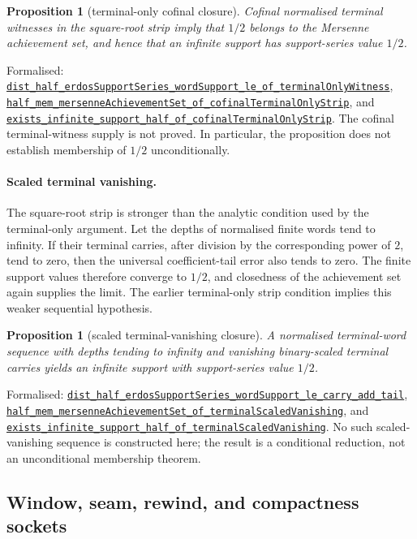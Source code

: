 \documentclass[11pt]{article}
\newcommand{\commit}{81150c1c6fdd4cd51e76d3aa0de344341e0e9e7c}
\newcommand{\repobase}{https://github.com/wcook04/plectis-lean-erdos249-257/blob/\commit}
\newcommand{\PK}{Erdos249257}
\newcommand{\lref}[3]{\href{\repobase/\PK/#1\#L#2}{\nolinkurl{#3}}}
\newtheorem{proposition}[theorem]{Proposition}
\theoremstyle{definition}
\theoremstyle{remark}
\begin{document}
\begin{proposition}[terminal-only cofinal closure]\label{res:terminalonlycofinal}
Cofinal normalised terminal witnesses in the square-root strip imply that
$1/2$ belongs to the Mersenne achievement set, and hence that an infinite
support has support-series value $1/2$.
\end{proposition}
\noindent Formalised:
\lref{TerminalOnlyCofinal.lean}{68}{dist_half_erdosSupportSeries_wordSupport_le_of_terminalOnlyWitness},
\lref{TerminalOnlyCofinal.lean}{134}{half_mem_mersenneAchievementSet_of_cofinalTerminalOnlyStrip},
and
\lref{TerminalOnlyCofinal.lean}{192}{exists_infinite_support_half_of_cofinalTerminalOnlyStrip}.
The cofinal terminal-witness supply is not proved.  In particular, the
proposition does not establish membership of $1/2$ unconditionally.

\paragraph{Scaled terminal vanishing.}  The square-root strip is stronger
than the analytic condition used by the terminal-only argument.  Let the
depths of normalised finite words tend to infinity.  If their terminal carries,
after division by the corresponding power of $2$, tend to zero, then the
universal coefficient-tail error also tends to zero.  The finite support
values therefore converge to $1/2$, and closedness of the achievement set
again supplies the limit.  The earlier terminal-only strip condition implies
this weaker sequential hypothesis.

\begin{proposition}[scaled terminal-vanishing closure]\label{res:terminalscaledvanishing}
A normalised terminal-word sequence with depths tending to infinity and
vanishing binary-scaled terminal carries yields an infinite support with
support-series value $1/2$.
\end{proposition}
\noindent Formalised:
\lref{TerminalOnlyScaledVanishing.lean}{24}{dist_half_erdosSupportSeries_wordSupport_le_carry_add_tail},
\lref{TerminalOnlyScaledVanishing.lean}{165}{half_mem_mersenneAchievementSet_of_terminalScaledVanishing},
and
\lref{TerminalOnlyScaledVanishing.lean}{221}{exists_infinite_support_half_of_terminalScaledVanishing}.
No such scaled-vanishing sequence is constructed here; the result is a
conditional reduction, not an unconditional membership theorem.

\subsection{Window, seam, rewind, and compactness sockets}
\end{document}
